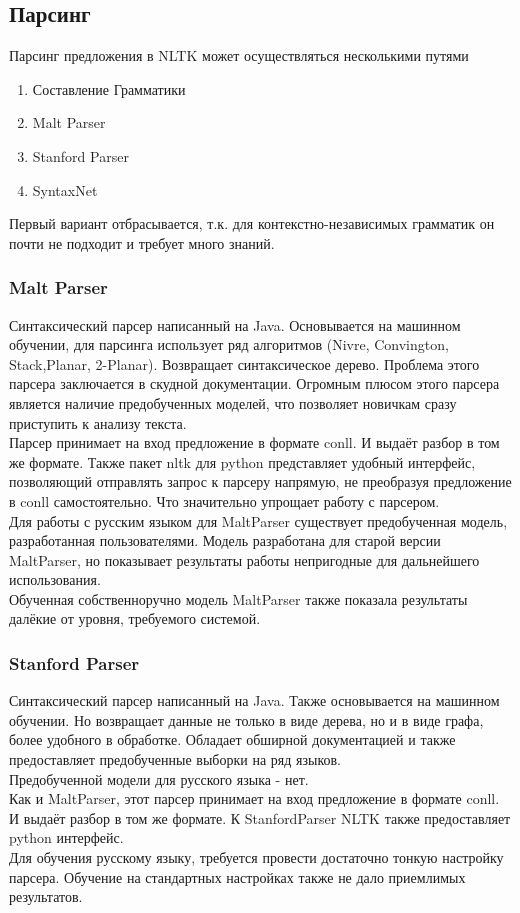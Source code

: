 \subsection{Парсинг}
Парсинг предложения в NLTK может осуществляться несколькими путями
\begin{enumerate}
\item Составление Грамматики
\item Malt Parser
\item Stanford Parser
\item SyntaxNet
\end{enumerate}
Первый вариант отбрасывается, т.к. для контекстно-независимых грамматик он почти не подходит и требует много знаний.
\subsubsection{Malt Parser}
Синтаксический парсер написанный на Java. Основывается на машинном обучении, для парсинга использует ряд алгоритмов (Nivre, Convington, Stack,Planar, 2-Planar). Возвращает синтаксическое дерево. Проблема этого парсера заключается в скудной документации. Огромным плюсом этого парсера является наличие предобученных моделей, что позволяет новичкам сразу приступить к анализу текста. \\
Парсер принимает на вход предложение в формате conll. И выдаёт разбор в том же формате. Также пакет nltk для python представляет удобный интерфейс, позволяющий отправлять запрос к парсеру напрямую, не преобразуя предложение в conll самостоятельно. Что значительно упрощает работу с парсером.
\\
Для работы с русским языком для MaltParser существует предобученная модель, разработанная пользователями. Модель разработана для старой версии MaltParser, но показывает результаты работы непригодные для дальнейшего использования.
\\
Обученная собственноручно модель MaltParser также показала результаты далёкие от уровня, требуемого системой.

\subsubsection{Stanford Parser}
 Синтаксический парсер написанный на Java. Также основывается на машинном обучении. Но возвращает данные не только в виде дерева, но и в виде графа, более удобного в обработке. Обладает обширной документацией и также предоставляет предобученные выборки на ряд языков.\\
 Предобученной модели для русского языка - нет. \\
 Как и MaltParser, этот парсер принимает на вход предложение в формате conll. И выдаёт разбор в том же формате. К StanfordParser NLTK также предоставляет python интерфейс.
 \\
 Для обучения русскому языку, требуется провести достаточно тонкую настройку парсера. Обучение на стандартных настройках также не дало приемлимых результатов. 
